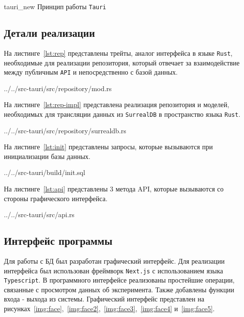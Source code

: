 \img{100mm}
{tauri_new}
{Принцип работы \texttt{Tauri}}

\subsection{Детали реализации}
На листинге~\ref{lst:rep} представлены трейты, аналог интерфейса в языке \texttt{Rust}, необходимые для реализации репозитория, который отвечает за взаимодействие между публичным \texttt{API} и непосредственно с базой данных.

\begin{lstinputlisting}[
        caption={\raggedrightТрейты, необходимые для реализации репозитория.},
        label={lst:rep},
        language={rust},
        style={rustlang}
    ]{../../src-tauri/src/repository/mod.rs}
\end{lstinputlisting}

На листинге~\ref{lst:rep-impl} представлена реализация репозитория и моделей, необходимых для трансляции данных из \texttt{SurrealDB} в пространство языка \texttt{Rust}.
\begin{lstinputlisting}[
        caption={\raggedrightРеализация репозитория.},
        label={lst:rep-impl},
        style={rustlang},
        language={rust},
        linerange={81-225}
    ]{../../src-tauri/src/repository/surrealdb.rs}
\end{lstinputlisting}

На листинге~\ref{lst:init} представлены запросы, которые вызываются при инициализации базы данных.
\begin{lstinputlisting}[
        caption={\raggedrightИнициализация базы данных.},
        label={lst:init},
        language={rust},
        style={rustlang}
    ]{../../src-tauri/build/init.sql}
\end{lstinputlisting}

На листинге~\ref{lst:api} представлены 3 метода API, которые вызываются со стороны графического интерфейса.
\begin{lstinputlisting}[
        caption={\raggedrightМетоды API.},
        label={lst:api},
        language={rust},
        style={rustlang},
        linerange={16-100}
    ]{../../src-tauri/src/api.rs}
\end{lstinputlisting}

\subsection{Интерфейс программы}
Для работы с БД был разработан графический интерфейс.
Для реализации интерфейса был использован фреймворк \texttt{Next.js} с использованием языка \texttt{Typescript}.
В программного интерфейсе реализованы простейшие операции, связанные с просмотром данных об эксперимента. 
Также добавлены функции входа - выхода из системы.
Графический интерфейс представлен на рисунках~\ref{img:face},~\ref{img:face2},~\ref{img:face3},~\ref{img:face4} и~\ref{img:face5}.

